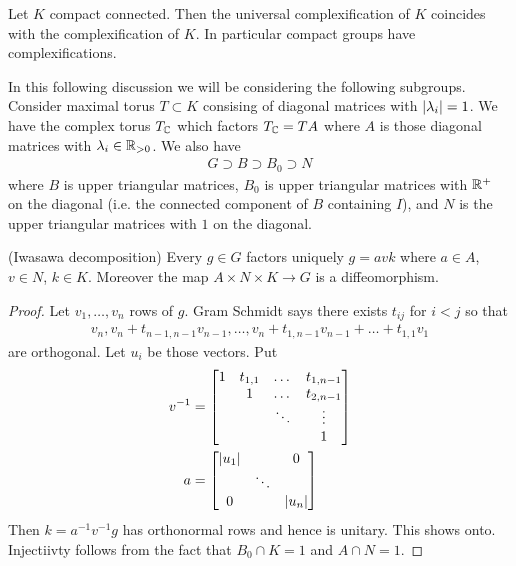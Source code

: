 \documentclass[12pt]{article}
\begin{document}
\begin{theorem}
    Let $K$ compact connected. Then the universal complexification of $K$ coincides with 
    the complexification of $K$. In particular compact groups have complexifications.
\end{theorem}


In this following discussion we will be considering the following subgroups.
Consider maximal torus $T\subset K$ consising of diagonal matrices with $\lvert \lambda_i\vert = 1$. 
We have the complex torus $T_{\mathbb{C}}$ which factors $T_{\mathbb{C}} = TA$ where $A$ is those
diagonal matrices with $\lambda_i\in\mathbb{R}_{>0}$. We also have \begin{align*}
    G \supset B \supset B_0 \supset N
\end{align*} where $B$ is upper triangular matrices, $B_0$ is upper triangular matrices 
with $\mathbb{R}^+$ on the diagonal (i.e. the connected component of $B$ containing $I$),
 and $N$ is the upper triangular matrices with $1$ on the diagonal.

\begin{proposition}
    (Iwasawa decomposition)
    Every $g\in G$ factors uniquely $g = avk$ where $a\in A$, $v\in N$, $k\in K$. Moreover the map 
    $A\times N\times K\to G$ is a diffeomorphism.
\end{proposition}

\begin{proof}
    Let $v_1,\dots,v_n$ rows of $g$. Gram Schmidt says there exists $t_{ij}$ for $i<j$ so that \begin{align*}
        v_n,v_n+t_{n-1,n-1}v_{n-1},\dots,v_n + t_{1,n-1}v_{n-1} + \dots + t_{1,1}v_1
    \end{align*} are orthogonal. Let $u_i$ be those vectors.
    Put \begin{align*}
        v^{-1} &= \begin{bmatrix}
            1 & t_{1,1} & \dots & t_{1,n-1}\\
            & 1 & \dots & t_{2,n-1}\\
            & & \ddots & \vdots\\
            & & & 1
        \end{bmatrix}\\
        a &= \begin{bmatrix}
            \lvert u_1\vert & & 0\\
            & \ddots & \\
            0 & & \lvert u_n\vert
        \end{bmatrix}
    \end{align*}
    Then $k = a^{-1}v^{-1}g$ has orthonormal rows and hence is unitary. This shows onto. 
    Injectiivty follows from the fact that $B_0\cap K = 1$ and $A\cap N = 1$.
\end{proof}
\end{document}

